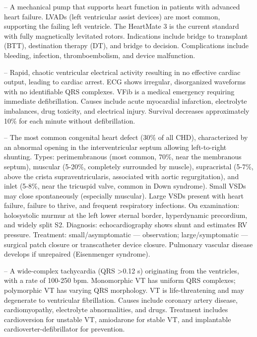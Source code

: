 -- A mechanical pump that supports heart function in patients with advanced heart failure. LVADs (left ventricular assist devices) are most common, supporting the failing left ventricle. The HeartMate 3 is the current standard with fully magnetically levitated rotors. Indications include bridge to transplant (BTT), destination therapy (DT), and bridge to decision. Complications include bleeding, infection, thromboembolism, and device malfunction.

-- Rapid, chaotic ventricular electrical activity resulting in no effective cardiac output, leading to cardiac arrest. ECG shows irregular, disorganized waveforms with no identifiable QRS complexes. VFib is a medical emergency requiring immediate defibrillation. Causes include acute myocardial infarction, electrolyte imbalances, drug toxicity, and electrical injury. Survival decreases approximately 10\% for each minute without defibrillation.

-- The most common congenital heart defect (30\% of all CHD), characterized by an abnormal opening in the interventricular septum allowing left-to-right shunting. Types: perimembranous (most common, 70\%, near the membranous septum), muscular (5-20\%, completely surrounded by muscle), supracristal (5-7\%, above the crista supraventricularis, associated with aortic regurgitation), and inlet (5-8\%, near the tricuspid valve, common in Down syndrome). Small VSDs may close spontaneously (especially muscular). Large VSDs present with heart failure, failure to thrive, and frequent respiratory infections. On examination: holosystolic murmur at the left lower sternal border, hyperdynamic precordium, and widely split S2. Diagnosis: echocardiography shows shunt and estimates RV pressure. Treatment: small/asymptomatic — observation; large/symptomatic — surgical patch closure or transcatheter device closure. Pulmonary vascular disease develops if unrepaired (Eisenmenger syndrome).

-- A wide-complex tachycardia (QRS >0.12 s) originating from the ventricles, with a rate of 100-250 bpm. Monomorphic VT has uniform QRS complexes; polymorphic VT has varying QRS morphology. VT is life-threatening and may degenerate to ventricular fibrillation. Causes include coronary artery disease, cardiomyopathy, electrolyte abnormalities, and drugs. Treatment includes cardioversion for unstable VT, amiodarone for stable VT, and implantable cardioverter-defibrillator for prevention.

